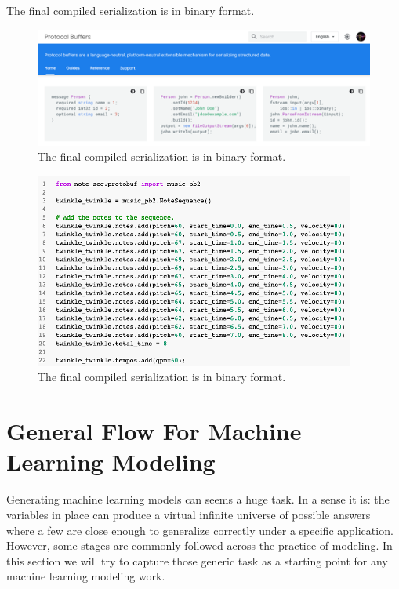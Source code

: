 The final compiled serialization is in binary format.

\begin{figure}[h!]
    \caption{The final compiled serialization is in binary format.}
    \includegraphics[width=\linewidth]{image/fig_JDF31.png}
\end{figure}

\begin{figure}[h!]
    \caption{The final compiled serialization is in binary format.}
    \includegraphics[width=\linewidth]{image/fig_JDF32.png}
\end{figure}

\section{General Flow For Machine Learning Modeling}

Generating machine learning models can seems a huge task. In a sense it is: the variables
in place can produce a virtual infinite universe of possible answers where a few are close
enough to generalize correctly under a specific application. However, some stages are
commonly followed across the practice of modeling. In this section we will try to capture
those generic task as a starting point for any machine learning modeling work.

